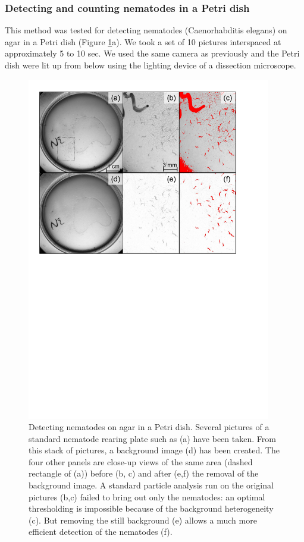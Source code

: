\subsubsection{Detecting and counting nematodes in a Petri dish}

This method was tested for detecting nematodes (Caenorhabditis elegans) on agar
in a Petri dish (Figure \ref{Fig21-2}a). We took a set of 10 pictures interspaced at
approximately 5 to 10 sec. We used the same camera as previously and the Petri
dish were lit up from below using the lighting device of a dissection
microscope.

\begin{figure}[!h] %
\centering
\includegraphics[width=0.95\textwidth]{2_Methodo/Fig/2_Nematodes.pdf} 
\caption[ Detecting nematodes on agar in a Petri dish]{
Detecting nematodes on agar in a Petri dish. Several pictures of a standard
nematode rearing plate such as (a) have been taken. From this stack of pictures,
a background image (d) has been created. The four other panels are close-up
views of the same area (dashed rectangle of (a)) before (b, c) and after (e,f)
the removal of the background image. A standard particle analysis run on the
original pictures (b,c) failed to bring out only the nematodes: an optimal
thresholding is impossible because of the background heterogeneity (c). But
removing the still background (e) allows a much more efficient detection of the
nematodes (f).}
\label{Fig21-2}
\end{figure}

